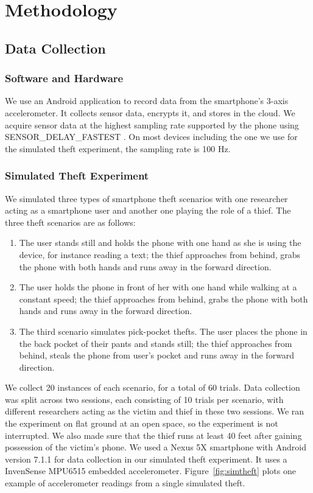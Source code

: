 \documentclass{soups}
\begin{document}
\section{Methodology}

\subsection{Data Collection}

\subsubsection{Software and Hardware}
We use an Android application to record data from the smartphone's 3-axis accelerometer.
It collects sensor data, encrypts it, and stores in the cloud.
We acquire sensor data at the highest sampling rate supported by the phone using SENSOR\_DELAY\_FASTEST \cite{android:doc}. 
On most devices including the one we use for the simulated theft experiment, the sampling rate is 100 Hz. 

\subsubsection{Simulated Theft Experiment}
We simulated three types of smartphone theft scenarios with one researcher acting as a smartphone user and another one playing the role of a thief. 
The three theft scenarios are as follows:
\begin{enumerate}
\item The user stands still and holds the phone with one hand as she is using the device, for instance reading a text; the thief approaches from behind, grabs the phone with both hands and runs away in the forward direction. 
\item The user holds the phone in front of her with one hand while walking at a constant speed; the thief approaches from behind, grabs the phone with both hands and runs away in the forward direction. 
\item The third scenario simulates pick-pocket thefts. The user places the phone in the back pocket of their pants and stands still; the thief approaches from behind, steals the phone from user's pocket and runs away in the forward direction.
\end{enumerate}
We collect 20 instances of each scenario, for a total of 60 trials. 
Data collection was split across two sessions, each consisting of 10 trials per scenario, with different researchers acting as the victim and thief in these two sessions. 
We ran the experiment on flat ground at an open space, so the experiment is not interrupted. 
We also made sure that the thief runs at least 40 feet after gaining possession of the victim's phone.
We used a Nexus 5X smartphone with Android version 7.1.1 for data collection in our simulated theft experiment. 
It uses a InvenSense MPU6515 embedded accelerometer.
Figure~\ref{fig:simtheft} plots one example of accelerometer readings from a single simulated theft.
\end{document}
